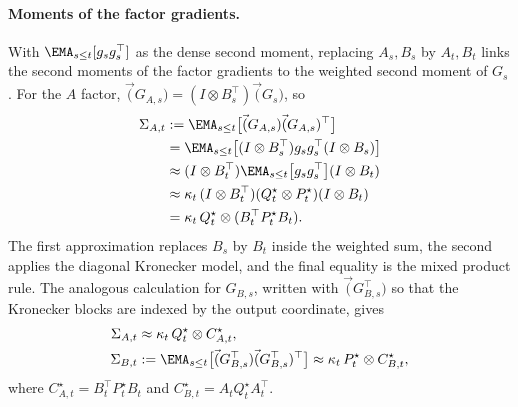 \paragraph{Moments of the factor gradients.}
With $\EMA_{s\le t}[g_sg_s^\top]$ as the dense second moment, replacing
$A_s,B_s$ by $A_t,B_t$ links the second moments of the factor gradients to
the weighted second moment of $G_s$. For the $A$ factor,
$\vec(G_{A,s})=(I\otimes B_s^\top)\vec(G_s)$, so
\begin{align*}
 \Sigma_{A,t}
 &:= \EMA_{s\le t}\big[\vec(G_{A,s})\vec(G_{A,s})^\top\big] \\
 &= \EMA_{s\le t}\big[
      (I\otimes B_s^\top)g_sg_s^\top(I\otimes B_s)
    \big] \\
 &\approx
    (I\otimes B_t^\top)
    \EMA_{s\le t}\big[g_sg_s^\top\big]
    (I\otimes B_t) \\
 &\approx
    \kappa_t\,(I\otimes B_t^\top)
    (Q^\star_t\otimes P^\star_t)
    (I\otimes B_t) \\
 &= \kappa_t\,Q^\star_t\otimes(B_t^\top P^\star_tB_t).
\end{align*}
The first approximation replaces $B_s$ by $B_t$ inside the weighted
sum, the second applies the diagonal Kronecker model, and the final
equality is the mixed product rule. The analogous calculation for
$G_{B,s}$, written with $\vec(G_{B,s}^\top)$ so that the Kronecker
blocks are indexed by the output coordinate, gives
\begin{align}
  \Sigma_{A,t}
    &\approx \kappa_t\,Q^\star_t\otimes C^\star_{A,t},
  \nonumber \\
  \Sigma_{B,t}
    &:= \EMA_{s\le t}\big[
      \vec(G_{B,s}^\top)\vec(G_{B,s}^\top)^\top
    \big]
    \approx \kappa_t\,P^\star_t\otimes C^\star_{B,t},
  \label{eq:observable-moments-p2}
\end{align}
where
$C^\star_{A,t}=B_t^\top P^\star_tB_t$ and
$C^\star_{B,t}=A_tQ^\star_tA_t^\top$.


